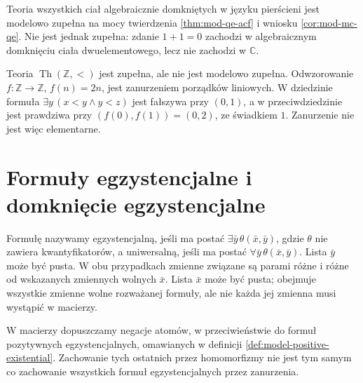 \begin{przyklad}
\label{ex:mod-mc-incomplete}
Teoria wszystkich ciał algebraicznie domkniętych
w języku pierścieni jest modelowo zupełna na mocy
twierdzenia \ref{thm:mod-qe-acf} i wniosku
\ref{cor:mod-mc-qe}. Nie jest jednak zupełna:
zdanie $1+1=0$ zachodzi w algebraicznym domknięciu
ciała dwuelementowego, lecz nie zachodzi w $\mathbb C$.
\end{przyklad}

\begin{przyklad}
\label{ex:mod-complete-not-mc}
Teoria $\operatorname{Th}(\mathbb Z,<)$ jest zupełna,
ale nie jest modelowo zupełna. Odwzorowanie
$f:\mathbb Z\to\mathbb Z$, $f(n)=2n$, jest zanurzeniem
porządków liniowych. W dziedzinie formuła
$\exists y\,(x<y\land y<z)$ jest fałszywa przy $(0,1)$,
a w przeciwdziedzinie jest prawdziwa przy $(f(0),f(1))=(0,2)$,
ze świadkiem $1$. Zanurzenie nie jest więc elementarne.
\end{przyklad}

\section{Formuły egzystencjalne i domknięcie egzystencjalne}
\begin{definicja}
\label{def:mod-mc-existential-universal}
Formułę nazywamy egzystencjalną, jeśli ma postać
$\exists\bar y\,\theta(\bar x,\bar y)$, gdzie $\theta$
nie zawiera kwantyfikatorów, a uniwersalną, jeśli ma
postać $\forall\bar y\,\theta(\bar x,\bar y)$.
Lista $\bar y$ może być pusta.
W obu przypadkach zmienne związane są parami różne
i różne od wskazanych zmiennych wolnych $\bar x$.
Lista $\bar x$ może być pusta; obejmuje wszystkie
zmienne wolne rozważanej formuły, ale nie każda jej
zmienna musi wystąpić w macierzy.
\end{definicja}

W macierzy dopuszczamy negacje atomów, w przeciwieństwie
do formuł pozytywnych egzystencjalnych, omawianych
w definicji \ref{def:model-positive-existential}.
Zachowanie tych ostatnich przez homomorfizmy nie jest
tym samym co zachowanie wszystkich formuł egzystencjalnych
przez zanurzenia.

